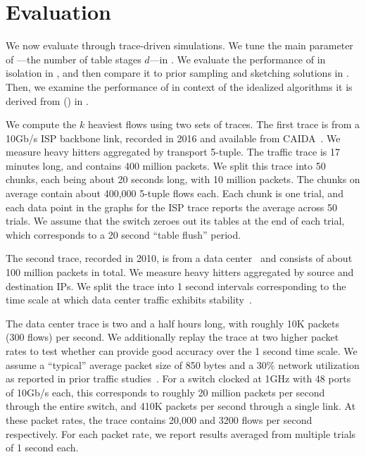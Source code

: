 \section{Evaluation}
\label{sec:evaluation}

We now evaluate \TheSystem through trace-driven simulations. We tune the
main parameter of \TheSystem---the number of table stages $d$---in
. We evaluate the performance of \TheSystem in isolation
in , and then compare it to prior sampling and
sketching solutions in . Then, we examine the
performance of \TheSystem in context of the idealized algorithms it is derived from
() in .

 We compute the $k$ heaviest flows using two sets of
traces. The first trace is from a 10Gb/s ISP backbone link, recorded in 2016 and
available from CAIDA~\cite{caida}. We measure heavy hitters aggregated by
transport 5-tuple.
The traffic trace is 17 minutes long, and
contains 400 million packets. We split this trace into 50 chunks, each being
about 20 seconds long, with 10 million packets. The chunks on average
contain about 400,000 5-tuple flows each. Each chunk is one trial, and each data
point in the graphs for the ISP trace reports the average across 50 trials. We
assume that the switch zeroes out its tables at the end of each trial, which
corresponds to a 20 second ``table flush'' period. %

The second trace, recorded in 2010, is from a data center~\cite{theo-dc-traffic}
and consists of about 100 million packets in total. We measure heavy hitters
aggregated by source and destination IPs. We split the trace into 1 second
intervals corresponding to the time scale at which data center traffic exhibits
stability~\cite{microTE}.

The data center trace is two and a half hours long, with roughly 10K packets
(300 flows) per 
second. We additionally replay the trace at two higher packet rates to test
whether \TheSystem can provide good accuracy over the 1 second time scale. We
assume a ``typical'' average packet size of 850 bytes and a 30\% network
utilization as reported in prior traffic studies~\cite{theo-dc-traffic}. For a
switch clocked at 1GHz with 48 ports of 10Gb/s each, this corresponds to roughly
20 million packets per second through the entire switch, and 410K packets per
second through a single link. At these packet rates, the trace contains
20,000 and 3200 flows per second respectively. For each packet rate, we report
results averaged
from multiple trials of 1 second each.

